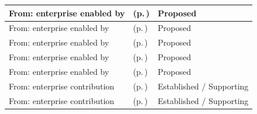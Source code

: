 \begin{longtable}{|>{\raggedright\arraybackslash}p{0.27\TableWidth}|>{\raggedright\arraybackslash}p{0.48\TableWidth}|>{\raggedright\arraybackslash}p{0.25\TableWidth}|}
From: enterprise enabled by & \nameref{cap:bec-service-capacity-management} (p.\,\pageref{cap:bec-service-capacity-management}) & Proposed\\\hline
From: enterprise enabled by & \nameref{cap:bec-work-allocation-dispatch} (p.\,\pageref{cap:bec-work-allocation-dispatch}) & Proposed\\\hline
From: enterprise enabled by & \nameref{cap:bec-patient-transport} (p.\,\pageref{cap:bec-patient-transport}) & Proposed\\\hline
From: enterprise enabled by & \nameref{cap:bec-clinical-logistics-coordination} (p.\,\pageref{cap:bec-clinical-logistics-coordination}) & Proposed\\\hline
From: enterprise enabled by & \nameref{cap:bec-discharge-management} (p.\,\pageref{cap:bec-discharge-management}) & Proposed\\\hline
From: enterprise contribution & \nameref{cap:bec-assurance-design} (p.\,\pageref{cap:bec-assurance-design}) & Established / Supporting\\\hline
From: enterprise contribution & \nameref{cap:bec-assurance-criteria-management} (p.\,\pageref{cap:bec-assurance-criteria-management}) & Established / Supporting\\\hline
\end{longtable}\endgroup

